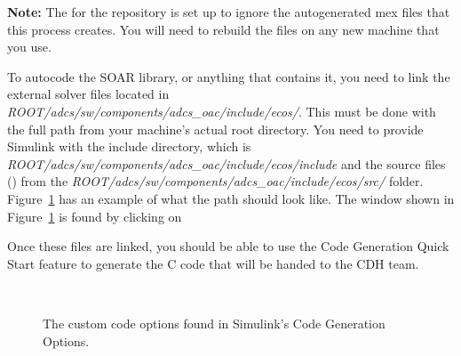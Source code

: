 \documentclass[10pt]{article}
\begin{document}
\textbf{Note:} The  for the repository is set up to ignore the autogenerated mex files that this process creates. You will need to rebuild the files on any new machine that you use.

To autocode the SOAR library, or anything that contains it, you need to link the external solver files located in \textit{ROOT/adcs/sw/components/adcs\_oac/include/ecos/}. This must be done with the full path from your machine's actual root directory. You need to provide Simulink with the include directory, which is \textit{ROOT/adcs/sw/components/adcs\_oac/include/ecos/include} and the source files () from the \textit{ROOT/adcs/sw/components/adcs\_oac/include/ecos/src/} folder. Figure~\ref{fig:autocode} has an example of what the path should look like. The window shown in Figure~\ref{fig:autocode} is found by clicking on
\begin{center}
\end{center}
Once these files are linked, you should be able to use the Code Generation Quick Start feature to generate the C code that will be handed to the CDH team.

\begin{figure}
\centering
{} \\
\caption{The custom code options found in Simulink's Code Generation Options.}
\label{fig:autocode}
\end{figure}
\end{document}
